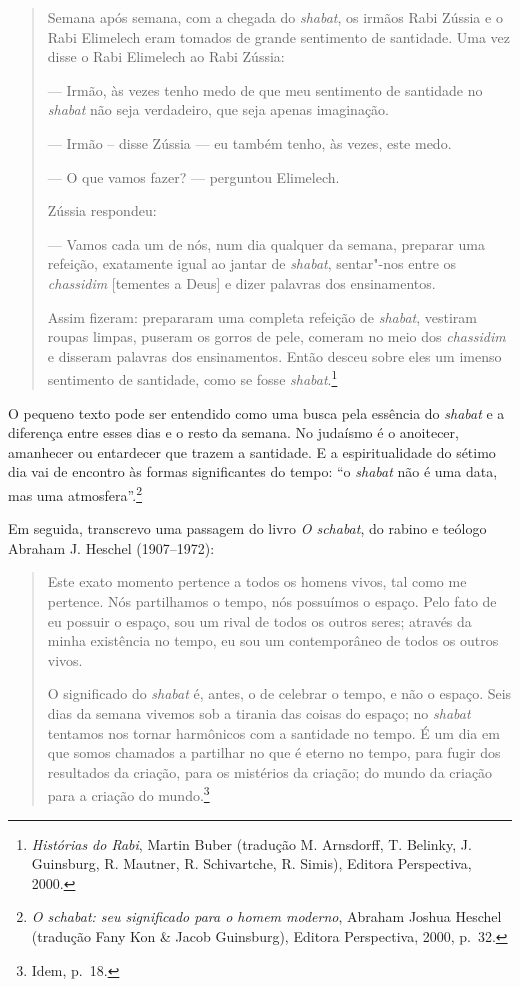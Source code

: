 \begin{quote}
Semana após semana, com a chegada do \emph{shabat}, os irmãos Rabi Zússia
e o Rabi Elimelech eram tomados de grande sentimento de santidade. Uma
vez disse o Rabi Elimelech ao Rabi Zússia:

--- Irmão, às vezes tenho medo de que meu sentimento de santidade
no \emph{shabat} não seja verdadeiro, que seja apenas imaginação.

--- Irmão -- disse Zússia --- eu também tenho, às vezes, este medo.

--- O que vamos fazer? --- perguntou Elimelech.

Zússia respondeu:

--- Vamos cada um de nós, num dia qualquer da semana, preparar uma
refeição, exatamente igual ao jantar de \emph{shabat}, sentar"-nos entre os
\emph{chassidim} [tementes a Deus] e dizer palavras dos ensinamentos.

Assim fizeram: prepararam uma completa refeição de \emph{shabat},
vestiram roupas limpas, puseram os gorros de pele, comeram no meio dos
\emph{chassidim} e disseram palavras dos ensinamentos. Então desceu sobre eles
um imenso sentimento de santidade, como se fosse \emph{shabat}.\footnote{\emph{Histórias do Rabi}, Martin Buber (tradução M. Arnsdorff, T. Belinky, J. Guinsburg, R. Mautner, R. Schivartche, R. Simis), Editora Perspectiva, 2000.}
\end{quote}

O pequeno texto pode ser entendido como uma busca pela essência
do \emph{shabat} e a diferença entre esses dias e o resto da semana. No judaísmo é o anoitecer, amanhecer ou entardecer que trazem a santidade. E a espiritualidade do sétimo dia vai de encontro às formas significantes do tempo: ``o \emph{shabat} não é uma data, mas uma atmosfera''.\footnote{\emph{O schabat: seu significado para o homem moderno}, Abraham Joshua Heschel (tradução Fany Kon \& Jacob Guinsburg), Editora Perspectiva, 2000, p.~32.}

Em seguida, transcrevo uma passagem do livro \emph{O schabat}, do rabino e teólogo 
Abraham J. Heschel (1907--1972):

\begin{quote}
Este exato momento pertence a todos os homens vivos, tal como me
pertence. Nós partilhamos o tempo, nós possuímos o espaço. Pelo fato de
eu possuir o espaço, sou um rival de todos os outros seres; através da
minha existência no tempo, eu sou um contemporâneo de todos os outros
vivos.

O significado do \emph{shabat} é, antes, o de celebrar o tempo, e não o
espaço. Seis dias da semana vivemos sob a tirania das coisas do espaço;
no \emph{shabat} tentamos nos tornar harmônicos com a santidade no tempo. É um
dia em que somos chamados a partilhar no que é eterno no tempo, para
fugir dos resultados da criação, para os mistérios da criação; do mundo
da criação para a criação do mundo.\footnote{Idem, p.~18.}
\end{quote}

